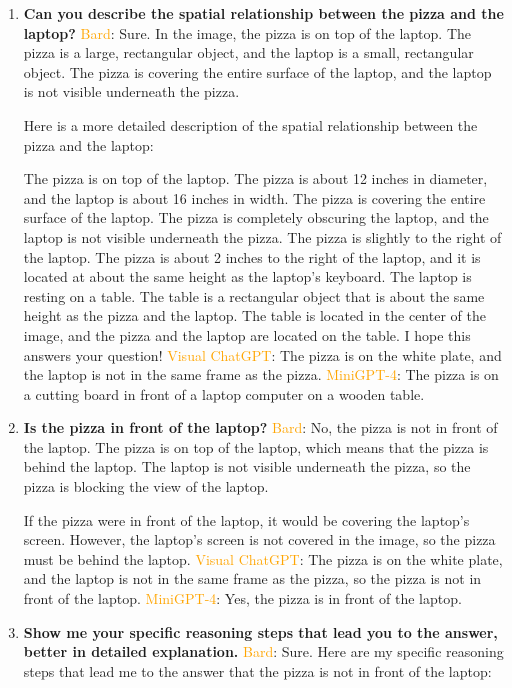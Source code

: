     \begin{enumerate}
        \item \textbf{Can you describe the spatial relationship between the pizza and the laptop?}
        \subitem \textcolor{orange}{Bard}: 
        Sure. In the image, the pizza is on top of the laptop. The pizza is a large, rectangular object, and the laptop is a small, rectangular object. The pizza is covering the entire surface of the laptop, and the laptop is not visible underneath the pizza.

        Here is a more detailed description of the spatial relationship between the pizza and the laptop:

        The pizza is on top of the laptop. The pizza is about 12 inches in diameter, and the laptop is about 16 inches in width.
        The pizza is covering the entire surface of the laptop. The pizza is completely obscuring the laptop, and the laptop is not visible underneath the pizza.
        The pizza is slightly to the right of the laptop. The pizza is about 2 inches to the right of the laptop, and it is located at about the same height as the laptop's keyboard.
        The laptop is resting on a table. The table is a rectangular object that is about the same height as the pizza and the laptop. The table is located in the center of the image, and the pizza and the laptop are located on the table.
        I hope this answers your question!
        \subitem \textcolor{orange}{Visual ChatGPT}: The pizza is on the white plate, and the laptop is not in the same frame as the pizza.
        \subitem \textcolor{orange}{MiniGPT-4}: The pizza is on a cutting board in front of a laptop computer on a wooden table.
        \item \textbf{Is the pizza in front of the laptop?}
        \subitem \textcolor{orange}{Bard}: No, the pizza is not in front of the laptop. The pizza is on top of the laptop, which means that the pizza is behind the laptop. The laptop is not visible underneath the pizza, so the pizza is blocking the view of the laptop.

        If the pizza were in front of the laptop, it would be covering the laptop's screen. However, the laptop's screen is not covered in the image, so the pizza must be behind the laptop.
        \subitem \textcolor{orange}{Visual ChatGPT}: The pizza is on the white plate, and the laptop is not in the same frame as the pizza, so the pizza is not in front of the laptop.
        \subitem \textcolor{orange}{MiniGPT-4}: Yes, the pizza is in front of the laptop.
        \item \textbf{Show me your specific reasoning steps that lead you to the answer, better in detailed explanation.}
        \subitem \textcolor{orange}{Bard}: 
        Sure. Here are my specific reasoning steps that lead me to the answer that the pizza is not in front of the laptop:


\end{enumerate}
